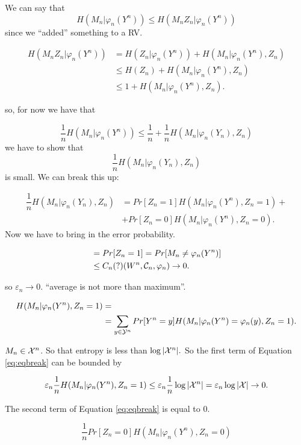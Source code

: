 We can say that
\[
 H(M_n|\varphi_n(Y^n)) \leq H(M_nZ_n | \varphi_n(Y^n))
\]
since we ``added'' something to a RV.

\begin{align*}
 H(M_nZ_n | \varphi_n(Y^n)) & = H(Z_n|\varphi_n(Y^n)) + H(M_n|\varphi_n(Y^n), Z_n)\\
 & \leq H(Z_n) + H(M_n|\varphi_n(Y^n), Z_n) \\
 & \leq 1+ H(M_n|\varphi_n(Y^n), Z_n).
\end{align*}

so, for now we have that

\[
 \dfrac{1}{n}H(M_n|\varphi_n(Y^n)) \leq \dfrac{1}{n} + \dfrac{1}{n}H(M_n|\varphi_n(Y_n), Z_n)
\]
we have to show that $$ \dfrac{1}{n}H(M_n|\varphi_n(Y_n), Z_n)$$ is small. We can break this up:

\begin{equation}\label{eq:eqbreak}
\begin{align*}
 \dfrac{1}{n}H(M_n|\varphi_n(Y_n), Z_n) &= Pr[Z_n = 1]H(M_n|\varphi_n(Y^n), Z_n = 1) + \\
 &+ Pr[Z_n = 0]H(M_n|\varphi_n(Y^n), Z_n = 0).  
\end{align*}
 \end{equation}
Now we have to bring in the error probability.

\begin{align*}
  & = Pr[Z_n = 1] = Pr[M_n \not=\varphi_n(Y^n)]\\
  & \leq C_n (?)(W^n, \mathcal{C}_n, \varphi_n) \rightarrow 0.
\end{align*}

so $\varepsilon_n \rightarrow 0$. ``average is not more than maximum''.

\begin{align*}
 H(M_n | \varphi_n(Y^n), Z_n = 1) &= \\
 & =\sum_{y \in \mathcal{Y}^n} Pr[Y^n = y]H(M_n|\varphi_n(Y^n) = \varphi_n(y), Z_n = 1).
\end{align*}


$M_n \in \mathcal{X}^n$. So that entropy is less than $\log|\mathcal{X}^n|.$ So the first term of Equation \ref{eq:eqbreak} can be bounded by

\[
 \varepsilon_n \dfrac{1}{n}H(M_n|\varphi_n(Y^n), Z_n = 1) \leq \varepsilon_n \dfrac{1}{n} \log|\mathcal{X}^n| = \varepsilon_n \log|\mathcal{X}| \rightarrow 0.
\]

The second term of Equation \ref{eq:eqbreak} is equal to 0.

\[
 \dfrac{1}{n}Pr[Z_n = 0] H(M_n|\varphi_n(Y^n), Z_n = 0)
\]

